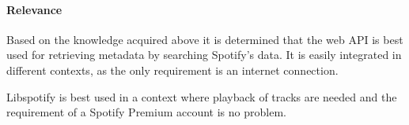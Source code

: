 \paragraph{Relevance}
\label{par:relevance}

Based on the knowledge acquired above it is determined that the web API is best used for retrieving metadata by searching Spotify's data. It is easily integrated in different contexts, as the only requirement is an internet connection.

Libspotify is best used in a context where playback of tracks are needed and the requirement of a Spotify Premium account is no problem.
